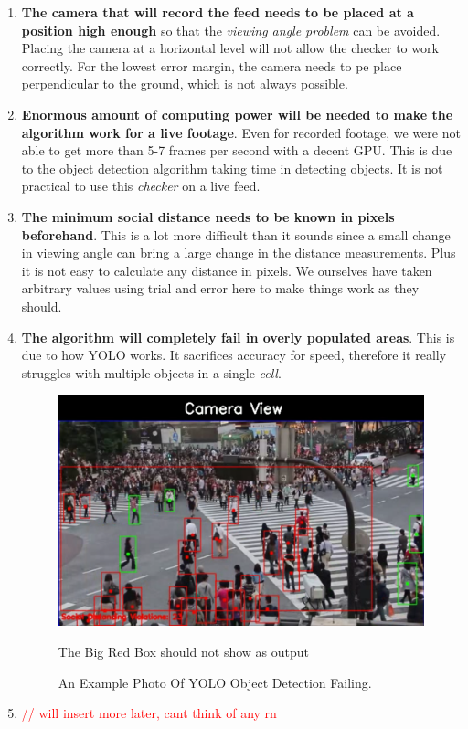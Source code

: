 \documentclass[a4paper]{article}
\begin{document}
\begin{enumerate}
    \item \textbf{The camera that will record the feed needs to be placed at a position high enough} so that the \textit{viewing angle problem} can be avoided. Placing the camera at a horizontal level will not allow the checker to work correctly. For the lowest error margin, the camera needs to pe place perpendicular to the ground, which is not always possible.
    \item \textbf{Enormous amount of computing power will be needed to make the algorithm work for a live footage}. Even for recorded footage, we were not able to get more than 5-7 frames per second with a decent GPU. This is due to the object detection algorithm taking time in detecting objects. It is not practical to use this \textit{checker} on a live feed.
    \item \textbf{The minimum social distance needs to be known in pixels beforehand}. This is a lot more difficult than it sounds since a small change in viewing angle can bring a large change in the distance measurements. Plus it is not easy to calculate any distance in pixels. We ourselves have taken arbitrary values using trial and error here to make things work as they should.
    \item \textbf{The algorithm will completely fail in overly populated areas}. This is due to how YOLO works. It sacrifices accuracy for speed, therefore it really struggles with multiple objects in a single \textit{cell}.
    \begin{figure}[h]
        \centering
        \includegraphics[width=\linewidth]{Pictures/shibuya_bad_frame.png}
        \caption{An Example Photo Of YOLO Object Detection Failing.}{The Big Red Box should not show as output}
        \label{fig:shibuyaFail}
    \end{figure}
    \item \textcolor{red}{// will insert more later, cant think of any rn}
\end{enumerate}
\end{document}
